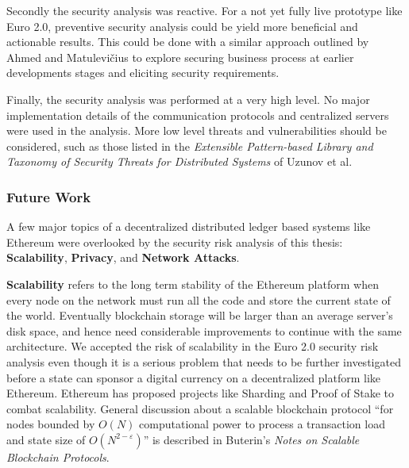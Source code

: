 \documentclass[a4paper,12pt]{article} %
\begin{document}
{Secondly the security analysis was reactive. For a not yet fully live prototype like Euro 2.0, preventive security analysis could be yield more beneficial and actionable results. This could be done with a similar approach outlined by Ahmed and Matulevi\v{c}ius\cite{Ahmed:2014:SBP:2588915.2589308} to explore securing business process at earlier developments stages and eliciting security requirements.

Finally, the security analysis was performed at a very high level. No major implementation details of the communication protocols and centralized servers were used in the analysis. More low level threats and vulnerabilities should be considered, such as those listed in the \textit{Extensible Pattern-based Library and Taxonomy of Security Threats for Distributed Systems} of Uzunov et al\cite{Uzunov:2014:EPL:2588915.2589309}.

\subsubsection{Future Work} \label{ssec:5.5:futureWork}

A few major topics of a decentralized distributed ledger based systems like Ethereum were overlooked by the security risk analysis of this thesis: \textbf{Scalability}, \textbf{Privacy}, and \textbf{Network Attacks}.

\textbf{Scalability} refers to the long term stability of the Ethereum platform when every node on the network must run all the code and store the current state of the world. Eventually blockchain storage will be larger than an average server's disk space, and hence need considerable improvements to continue with the same architecture. We accepted the risk of scalability in the Euro 2.0 security risk analysis even though it is a serious problem that needs to be further investigated before a state can sponsor a digital currency on a decentralized platform like Ethereum. Ethereum has proposed projects like Sharding\cite{shardingFaq} and Proof of Stake\cite{proofOfStakeFaq} to combat scalability. General discussion about a scalable blockchain protocol ``for nodes bounded by $O(N)$ computational power to process a transaction load and state size of $O(N^{2-\varepsilon})$'' is described in Buterin's \textit{Notes on Scalable Blockchain Protocols}\cite{notesOnScalableBlockchains}.

}
\end{document}
